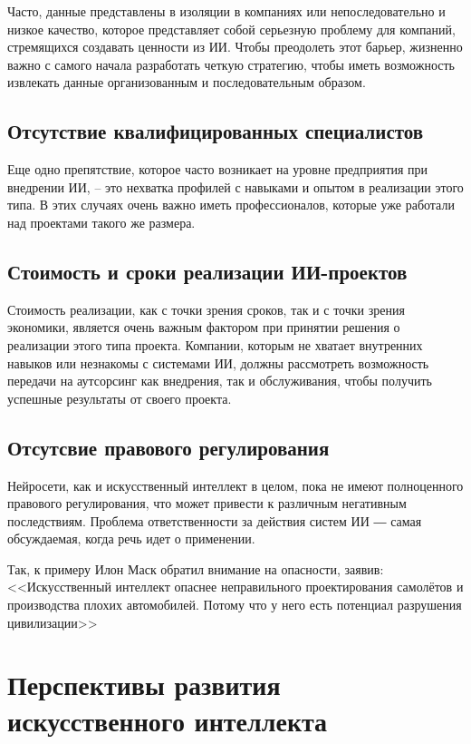 \documentclass[bachelor,och,referat]{SCWorks_corrected}
\begin{document}
Часто, данные представлены в изоляции в компаниях или непоследовательно и низкое качество, которое представляет собой серьезную проблему для компаний, стремящихся создавать ценности из ИИ. Чтобы преодолеть этот барьер, жизненно важно с самого начала разработать четкую стратегию, чтобы иметь возможность извлекать данные организованным и последовательным образом.\cite{N14}

\subsection{Отсутствие квалифицированных специалистов}
    
Еще одно препятствие, которое часто возникает на уровне предприятия при внедрении ИИ, – это нехватка профилей с навыками и опытом в реализации этого типа. В этих случаях очень важно иметь профессионалов, которые уже работали над проектами такого же размера.
    
\subsection{Стоимость и сроки реализации ИИ-проектов}
    
Стоимость реализации, как с точки зрения сроков, так и с точки зрения экономики, является очень важным фактором при принятии решения о реализации этого типа проекта. Компании, которым не хватает внутренних навыков или незнакомы с системами ИИ, должны рассмотреть возможность передачи на аутсорсинг как внедрения, так и обслуживания, чтобы получить успешные результаты от своего проекта.

\subsection{Отсутсвие правового регулирования}

Нейросети, как и искусственный интеллект в целом, пока не имеют полноценного правового регулирования, что может привести к различным негативным последствиям. Проблема ответственности за действия систем ИИ ― самая обсуждаемая, когда речь идет о применении. 

Так, к примеру Илон Маск обратил внимание на опасности, заявив: <<Искусственный интеллект опаснее неправильного проектирования самолётов и производства плохих автомобилей. Потому что у него есть потенциал разрушения цивилизации>>

\section{Перспективы развития искусственного интеллекта}
\end{document}
